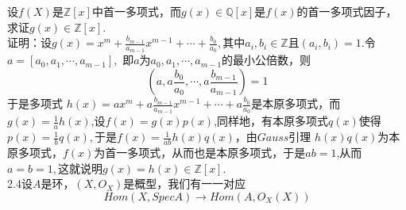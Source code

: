 \documentclass[UTF8]{article}
\begin{document}
设$f(X)$是$\mathbb{Z}[x]$中首一多项式，而$g(x)\in \mathbb{Q}[x]$是$f(x)$的首一多项式因子，求证$g(x)\in \mathbb{Z}[x].$\\
证明：设$g(x)=x^{m}+\frac{b_{m-1}}{a_{m-1}}x^{m-1}+\cdots+\frac{b_{0}}{a_{0}},$其中$a_{i},b_{i}\in \mathbb{Z}$且$(a_{i},b_{i})=1.$令$a=[a_{0},a_{1},\cdots,a_{m-1}],$
即$a$为$a_{0},a_{1},\cdots,a_{m-1}$的最小公倍数，则
$$
(a,a\frac{b_{0}}{a_{0}},\cdots,a\frac{b_{m-1}}{a_{m-1}})=1
$$
于是多项式
$h(x)=ax^{m}+a\frac{b_{m-1}}{a_{m-1}}x^{m-1}+\cdots+a\frac{b_{0}}{a_{0}}$是本原多项式，而$g(x)=\frac{1}{a}h(x)$,设$f(x)=g(x)p(x)$,同样地，有本原多项式$q(x)$使得$p(x)=\frac{1}{b}q(x),$于是$f(x)=\frac{1}{ab}h(x)q(x)$，由$Gauss$引理
$h(x)q(x)$为本原多项式，$f(x)$为首一多项式，从而也是本原多项式，于是$ab=1$,从而$a=b=1,$这就说明$g(x)=h(x)\in\mathbb{Z}[x].$\\

2.4设$A$是环，$(X,O_{X})$是概型，我们有一一对应
$$
Hom(X,SpecA)\rightarrow Hom(A,O_{X}(X))
$$
\end{document}
